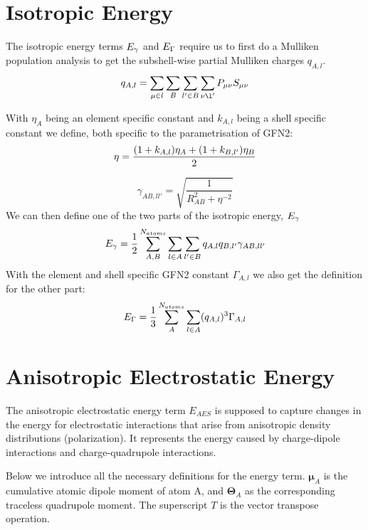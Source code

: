 \section{Isotropic Energy}
The isotropic energy terms $\E{\gamma}$ and $\E{\Gamma}$ require us to first do a Mulliken population analysis to get the subshell-wise partial Mulliken charges $q_{A,l}$.
\begin{equation}
    q_{A,l} = \sum_{\mu\in l}\sum_B\sum_{l'\in B}\sum_{\nu\l'}P_{\mu\nu}S_{\mu\nu}\\
\end{equation}

With $\eta_A$ being an element specific constant and $k_{A,l}$ being a shell specific constant we define, both specific to the parametrisation of GFN2:
\begin{equation}
    \eta = \frac{(1+k_{A,l})\eta_A+(1+k_{B,l'})\eta_B}{2}\\
\end{equation}

\begin{equation}
    \gamma_{AB,ll'} = \sqrt{\frac{1}{R_{AB}^2+\eta^{-2}}}
\end{equation}
We can then define one of the two parts of the isotropic energy, $\E{\gamma}$
\begin{equation}
    \E{\gamma} = \frac{1}{2}\sum_{A,B}^{N_{atoms}}\sum_{l\in A}\sum_{l'\in B}q_{A,l}q_{B,l'}\gamma_{AB,ll'}\label{eq:gamma}
\end{equation}
With the element and shell specific GFN2 constant $\Gamma_{A,l}$ we also get the definition for the other part:
\begin{equation}
    \E{\Gamma} = \frac{1}{3}\sum_A^{N_{atoms}}\sum_{l\in A}(q_{A,l})^3\Gamma_{A,l} \label{eq:Gamma}
\end{equation}



\section{Anisotropic Electrostatic Energy} \label{sec:AES}

The anisotropic electrostatic energy term $E_{AES}$ is supposed to capture changes in the energy for electrostatic interactions that arise from anisotropic density distributions (polarization). It represents the energy caused by charge-dipole interactions and charge-quadrupole interactions.

Below we introduce all the necessary definitions for the energy term.
$\pmb{\mu}_A$ is the cumulative atomic dipole moment of atom A, and $\pmb{\Theta}_A$ as the corresponding traceless quadrupole moment. The superscript $T$ is the vector transpose operation.

